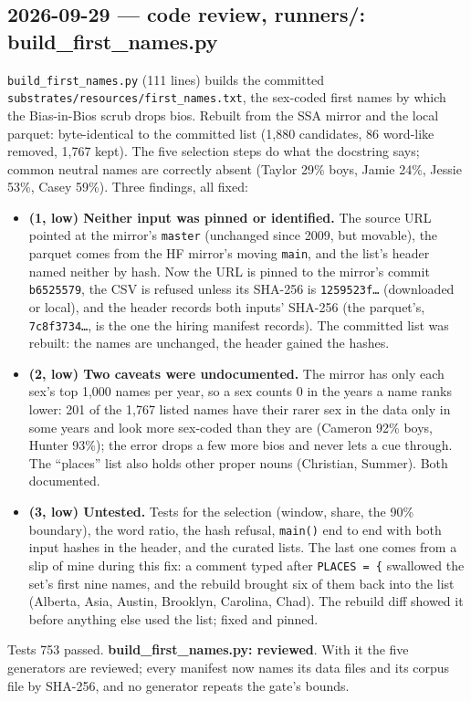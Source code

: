 \documentclass{article}
\begin{document}
\subsection*{2026-09-29 --- code review, runners/: build\_first\_names.py}
\texttt{build\_first\_names.py} (111 lines) builds the committed \texttt{substrates/resources/first\_names.txt}, the
sex-coded first names by which the Bias-in-Bios scrub drops bios. Rebuilt from the SSA mirror and the local
parquet: byte-identical to the committed list (1{,}880 candidates, 86 word-like removed, 1{,}767 kept). The five
selection steps do what the docstring says; common neutral names are correctly absent (Taylor 29\% boys, Jamie
24\%, Jessie 53\%, Casey 59\%). Three findings, all fixed:
\begin{itemize}
  \item \textbf{(1, low) Neither input was pinned or identified.} The source URL pointed at the mirror's
        \texttt{master} (unchanged since 2009, but movable), the parquet comes from the HF mirror's moving
        \texttt{main}, and the list's header named neither by hash. Now the URL is pinned to the mirror's commit
        \texttt{b6525579}, the CSV is refused unless its SHA-256 is \texttt{1259523f\ldots} (downloaded or local),
        and the header records both inputs' SHA-256 (the parquet's, \texttt{7c8f3734\ldots}, is the one the hiring
        manifest records). The committed list was rebuilt: the names are unchanged, the header gained the hashes.
  \item \textbf{(2, low) Two caveats were undocumented.} The mirror has only each sex's top 1{,}000 names per year,
        so a sex counts 0 in the years a name ranks lower: 201 of the 1{,}767 listed names have their rarer sex in
        the data only in some years and look more sex-coded than they are (Cameron 92\% boys, Hunter 93\%); the
        error drops a few more bios and never lets a cue through. The ``places'' list also holds other proper
        nouns (Christian, Summer). Both documented.
  \item \textbf{(3, low) Untested.} Tests for the selection (window, share, the 90\% boundary), the word ratio, the
        hash refusal, \texttt{main()} end to end with both input hashes in the header, and the curated lists. The
        last one comes from a slip of mine during this fix: a comment typed after \texttt{PLACES = \{} swallowed the
        set's first nine names, and the rebuild brought six of them back into the list (Alberta, Asia, Austin,
        Brooklyn, Carolina, Chad). The rebuild diff showed it before anything else used the list; fixed and
        pinned.
\end{itemize}
Tests 753 passed. \textbf{build\_first\_names.py: reviewed}. With it the five generators are reviewed; every
manifest now names its data files and its corpus file by SHA-256, and no generator repeats the gate's bounds.
\end{document}
